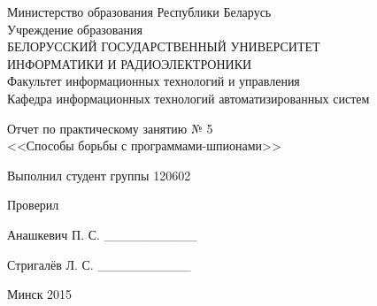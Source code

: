 \thispagestyle{empty}
\setlength{\parindent}{0ex} %

\begin{center}
  Министерство образования Республики Беларусь \\
  \vspace{0.5ex}
  Учреждение образования \\
  БЕЛОРУССКИЙ ГОСУДАРСТВЕННЫЙ УНИВЕРСИТЕТ \\
  ИНФОРМАТИКИ И РАДИОЭЛЕКТРОНИКИ \\
  \vspace{0.5ex}
  Факультет информационных технологий и управления \\
  \vspace{0.5ex}
  Кафедра информационных технологий автоматизированных систем
\end{center}

\vspace{50mm}

\begin{center}
  Отчет по практическому занятию № 5 \\
  <<Способы борьбы с программами-шпионами>>
\end{center}

\vspace{55mm}

\begin{minipage}{.55\linewidth}
    Выполнил студент группы 120602

    \smallskip

    Проверил
\end{minipage}
\hfill
\begin{minipage}{.4\linewidth}
  \begin{flushright}
    Анашкевич П. С. \_\_\_\_\_\_\_\_\_\_

    \smallskip

    Стригалёв Л. С. \_\_\_\_\_\_\_\_\_\_
  \end{flushright}
\end{minipage}

\vspace{45mm}
\begin{center}
  Минск 2015
\end{center}

\setlength{\parindent}{1.25cm} %

\newpage
